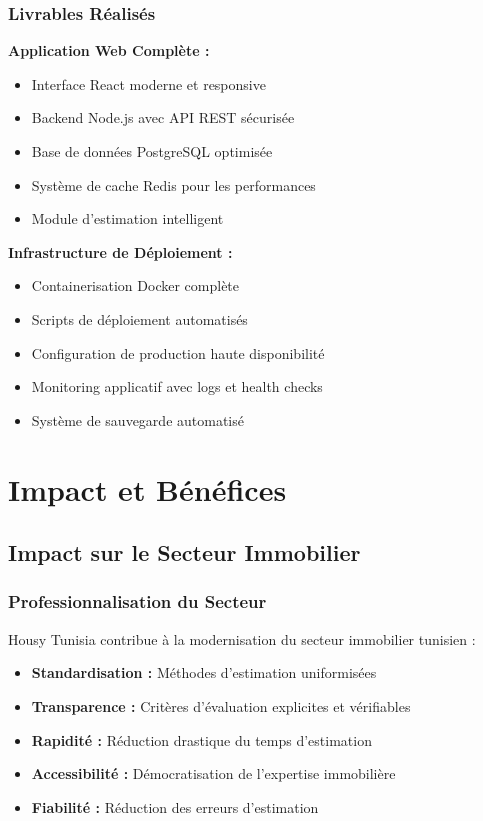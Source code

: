 \subsubsection{Livrables Réalisés}

\textbf{Application Web Complète :}
\begin{itemize}
    \item Interface React moderne et responsive
    \item Backend Node.js avec API REST sécurisée
    \item Base de données PostgreSQL optimisée
    \item Système de cache Redis pour les performances
    \item Module d'estimation intelligent
\end{itemize}

\textbf{Infrastructure de Déploiement :}
\begin{itemize}
    \item Containerisation Docker complète
    \item Scripts de déploiement automatisés
    \item Configuration de production haute disponibilité
    \item Monitoring applicatif avec logs et health checks
    \item Système de sauvegarde automatisé
\end{itemize}

\section{Impact et Bénéfices}

\subsection{Impact sur le Secteur Immobilier}

\subsubsection{Professionnalisation du Secteur}

Housy Tunisia contribue à la modernisation du secteur immobilier tunisien :

\begin{itemize}
    \item \textbf{Standardisation :} Méthodes d'estimation uniformisées
    \item \textbf{Transparence :} Critères d'évaluation explicites et vérifiables
    \item \textbf{Rapidité :} Réduction drastique du temps d'estimation
    \item \textbf{Accessibilité :} Démocratisation de l'expertise immobilière
    \item \textbf{Fiabilité :} Réduction des erreurs d'estimation
\end{itemize}

